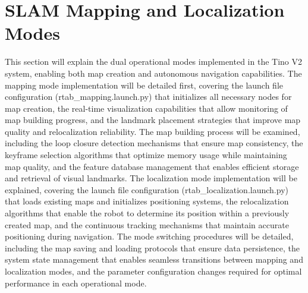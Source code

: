 \section{SLAM Mapping and Localization Modes}
This section will explain the dual operational modes implemented in the Tino V2 system, enabling both map creation and autonomous navigation capabilities. The mapping mode implementation will be detailed first, covering the launch file configuration (rtab\_mapping.launch.py) that initializes all necessary nodes for map creation, the real-time visualization capabilities that allow monitoring of map building progress, and the landmark placement strategies that improve map quality and relocalization reliability. The map building process will be examined, including the loop closure detection mechanisms that ensure map consistency, the keyframe selection algorithms that optimize memory usage while maintaining map quality, and the feature database management that enables efficient storage and retrieval of visual landmarks. The localization mode implementation will be explained, covering the launch file configuration (rtab\_localization.launch.py) that loads existing maps and initializes positioning systems, the relocalization algorithms that enable the robot to determine its position within a previously created map, and the continuous tracking mechanisms that maintain accurate positioning during navigation. The mode switching procedures will be detailed, including the map saving and loading protocols that ensure data persistence, the system state management that enables seamless transitions between mapping and localization modes, and the parameter configuration changes required for optimal performance in each operational mode.

